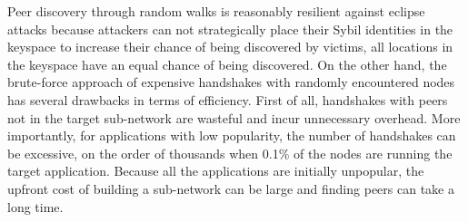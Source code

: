 Peer discovery through random walks is reasonably resilient against eclipse attacks because attackers can not strategically place their Sybil identities in the keyspace to increase their chance of being discovered by victims, \ie all locations in the keyspace have an equal chance of being discovered.
On the other hand, the brute-force approach of expensive handshakes with randomly encountered nodes has several drawbacks in terms of efficiency. First of all, handshakes with peers not in the target sub-network are wasteful and incur unnecessary overhead. %
More importantly, for applications with low popularity, the number of handshakes can be excessive, \ie on the order of thousands when 0.1\% of the nodes are running the target application. Because all the applications are initially unpopular, the upfront cost of building a sub-network can be large and finding peers can take a long time.
